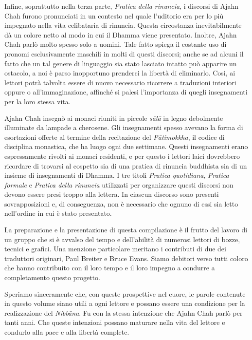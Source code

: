 Infine, soprattutto nella terza parte, \emph{Pratica della rinuncia}, i
discorsi di Ajahn Chah furono pronunciati in un contesto nel quale
l'uditorio era per lo più impegnato nella vita celibataria di rinuncia.
Questa circostanza inevitabilmente dà un colore netto al modo in cui il
Dhamma viene presentato. Inoltre, Ajahn Chah parlò molto spesso solo a
uomini. Tale fatto spiega il costante uso di pronomi esclusivamente
maschili in molti di questi discorsi; anche se ad alcuni il fatto che un
tal genere di linguaggio sia stato lasciato intatto può apparire un
ostacolo, a noi è parso inopportuno prenderci la libertà di eliminarlo.
Così, ai lettori potrà talvolta essere di nuovo necessario ricorrere a
traduzioni interiori oppure o all'immaginazione, affinché si palesi
l'importanza di quegli insegnamenti per la loro stessa vita.

Ajahn Chah insegnò ai monaci riuniti in piccole \emph{sālā} in legno
debolmente illuminate da lampade a cherosene. Gli insegnamenti spesso
avevano la forma di esortazioni offerte al termine della recitazione del
\emph{Pātimokkha}, il codice di disciplina monastica, che ha luogo ogni
due settimane. Questi insegnamenti erano espressamente rivolti ai monaci
residenti, e per questo i lettori laici dovrebbero ricordare di trovarsi
al cospetto sia di una pratica di rinuncia buddhista sia di un insieme
di insegnamenti di Dhamma. I tre titoli \emph{Pratica quotidiana},
\emph{Pratica formale} e \emph{Pratica della rinuncia} utilizzati per
organizzare questi discorsi non devono essere presi troppo alla lettera.
In ciascun discorso sono presenti sovrapposizioni e, di conseguenza, non
è necessario che ognuno di essi sia letto nell'ordine in cui è stato
presentato.

La preparazione e la presentazione di questa compilazione è il frutto
del lavoro di un gruppo che si è avvalso del tempo e dell'abilità di
numerosi lettori di bozze, tecnici e grafici. Una menzione particolare
meritano i contributi di due dei traduttori originari, Paul Breiter e
Bruce Evans. Siamo debitori verso tutti coloro che hanno contribuito con
il loro tempo e il loro impegno a condurre a completamento questo
progetto.

Speriamo sinceramente che, con queste prospettive nel cuore, le parole
contenute in questo volume siano utili a ogni lettore e possano essere
una condizione per la realizzazione del \emph{Nibbāna}. Fu con la stessa
intenzione che Ajahn Chah parlò per tanti anni. Che queste intenzioni
possano maturare nella vita del lettore e condurlo alla pace e alla
libertà complete.

